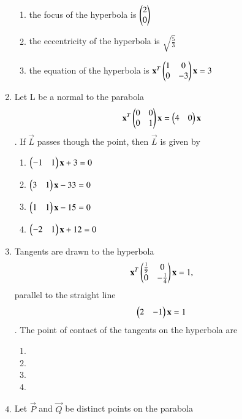 \documentclass[journal,12pt,twocolumn]{IEEEtran}
\begin{document}
\begin{enumerate}[label=\arabic*]
\begin{enumerate}
    \item the focus of the hyperbola is $\begin{pmatrix}2\\0\end{pmatrix}$
    \item the eccentricity of the hyperbola is $\sqrt{\frac{5}{3}}$
    \item the equation of the hyperbola is $\mathbf{x}^T  
    \begin{pmatrix}1& 0 \\0 & -3 \end{pmatrix}\mathbf{x}=3$
    \end{enumerate}
    \item Let L be a normal to the parabola
    \begin{align}
    \mathbf{x}^T \begin{pmatrix}0& 0 \\0 & 1\end{pmatrix} \mathbf{x}=\begin{pmatrix}4&0\end{pmatrix}\mathbf{x}
    \end{align}. If $\vec{L}$ passes though the point, then $\vec{L}$ is given by
    \begin{enumerate}
    \item $\begin{pmatrix}-1&1\end{pmatrix}\mathbf{x}+3=0$
    \item $\begin{pmatrix}3&1\end{pmatrix}\mathbf{x}-33=0$
    \item $\begin{pmatrix}1&1\end{pmatrix}\mathbf{x}-15=0$
    \item $\begin{pmatrix}-2&1\end{pmatrix}\mathbf{x}+12=0$
    \end{enumerate}
    \item Tangents are drawn to the hyperbola
    \begin{align}
    \mathbf{x}^T \begin{pmatrix}\frac{1}{9}& 0 \\0 & -\frac{1}{4}\end{pmatrix}\mathbf{x}=1,
    \end{align} parallel to the straight line
    \begin{align}
    \begin{pmatrix}2&-1\end{pmatrix}\mathbf{x}=1
    \end{align}. The point of contact of the tangents on the hyperbola are 
    \begin{enumerate}
    \item {}
    \item {}
    \item {}
    \item {}
    \end{enumerate}
    \item Let $\vec{P}$ and $\vec{Q}$ be distinct points on the parabola

\end{enumerate}
\end{document}
